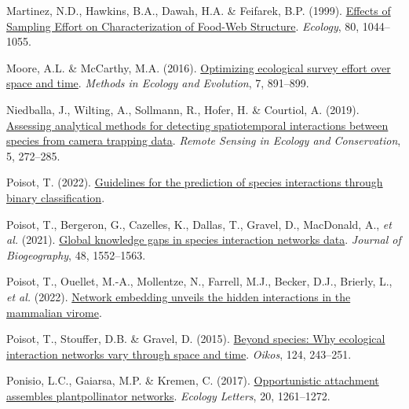 \documentclass[11pt]{article}
\newlength{\cslhangindent}
\newenvironment{CSLReferences}[3] %
 {%
  \setlength{\parindent}{0pt}
  \ifodd #1 \everypar{\setlength{\hangindent}{\cslhangindent}}\ignorespaces\fi
  \ifnum #2 > 0
  \setlength{\parskip}{#2\baselineskip}
  \fi
 }%
 {}
\begin{document}
\begin{CSLReferences}{1}{0}
\leavevmode{}%
Martinez, N.D., Hawkins, B.A., Dawah, H.A. \& Feifarek, B.P. (1999).
\href{https://doi.org/10.1890/0012-9658(1999)080\%5B1044:EOSEOC\%5D2.0.CO;2}{Effects
of Sampling Effort on Characterization of Food-Web Structure}.
\emph{Ecology}, 80, 1044--1055.

\leavevmode{}%
Moore, A.L. \& McCarthy, M.A. (2016).
\href{https://doi.org/10.1111/2041-210X.12564}{Optimizing ecological
survey effort over space and time}. \emph{Methods in Ecology and
Evolution}, 7, 891--899.

\leavevmode{}%
Niedballa, J., Wilting, A., Sollmann, R., Hofer, H. \& Courtiol, A.
(2019). \href{https://doi.org/10.1002/rse2.107}{Assessing analytical
methods for detecting spatiotemporal interactions between species from
camera trapping data}. \emph{Remote Sensing in Ecology and
Conservation}, 5, 272--285.

\leavevmode{}%
Poisot, T. (2022).
\href{https://doi.org/10.32942/osf.io/aty7n}{Guidelines for the
prediction of species interactions through binary classification}.

\leavevmode{}%
Poisot, T., Bergeron, G., Cazelles, K., Dallas, T., Gravel, D.,
MacDonald, A., \emph{et al.} (2021).
\href{https://doi.org/10.1111/jbi.14127}{Global knowledge gaps in
species interaction networks data}. \emph{Journal of Biogeography}, 48,
1552--1563.

\leavevmode{}%
Poisot, T., Ouellet, M.-A., Mollentze, N., Farrell, M.J., Becker, D.J.,
Brierly, L., \emph{et al.} (2022).
\href{https://doi.org/10.48550/arXiv.2105.14973}{Network embedding
unveils the hidden interactions in the mammalian virome}.

\leavevmode{}%
Poisot, T., Stouffer, D.B. \& Gravel, D. (2015).
\href{https://doi.org/10.1111/oik.01719}{Beyond species: Why ecological
interaction networks vary through space and time}. \emph{Oikos}, 124,
243--251.

\leavevmode{}%
Ponisio, L.C., Gaiarsa, M.P. \& Kremen, C. (2017).
\href{https://doi.org/10.1111/ele.12821}{Opportunistic attachment
assembles plantpollinator networks}. \emph{Ecology Letters}, 20,
1261--1272.


\end{CSLReferences}
\end{document}
